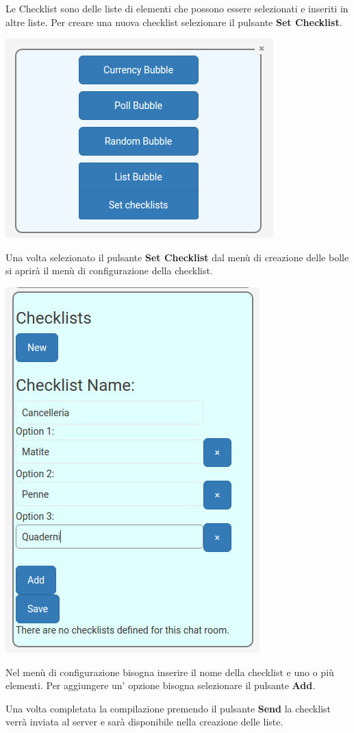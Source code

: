 \begin{flushleft}
Le Checklist sono delle liste di elementi che possono essere selezionati e inseriti in altre liste.
Per creare una nuova checklist selezionare il pulsante \textbf{Set Checklist}.\\
\begin{center}
\includegraphics[scale=0.75]{img/menu.png}
\end{center}

Una volta selezionato il pulsante \textbf{Set Checklist} dal menù di creazione delle bolle si aprirà il menù di configurazione della checklist.\\
\begin{center}
\includegraphics[scale=0.75]{img/checklist_conf.png}
\end{center}

Nel menù di configurazione bisogna inserire il nome della checklist e uno o più elementi.
Per aggiungere un' opzione bisogna selezionare il pulsante \textbf{Add}.

Una volta completata la compilazione premendo il pulsante \textbf{Send} la checklist verrà inviata al server e sarà disponibile nella creazione delle liste.
\end{flushleft}

